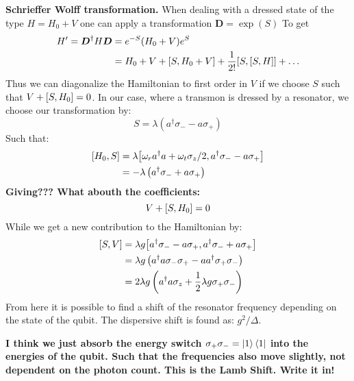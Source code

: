 \vspace{0.5 cm}
\textbf{Schrieffer Wolff transformation.} When dealing with a dressed state of the type $H = H_0 + V$ one can apply a transformation $\boldsymbol{D} = \exp(S)$ To get
\begin{align*}
    H' = \boldsymbol{D}^\dagger H \boldsymbol{D} &= e^{-S} (H_0 + V) e^{S} \\
    &= H_0 + V + \comm{S}{H_0 + V} + \frac{1}{2!} \comm{S}{\comm{S}{H}} + \dots
\end{align*}
Thus we can diagonalize the Hamiltonian to first order in $V$ if we choose $S$ such that $V + \comm{S}{H_0} = 0$. In our case, where a transmon is dressed by a resonator, we choose our transformation by:
\begin{equation}
    S = \lambda (a^\dagger \sigma_- - a \sigma_+)
\end{equation}
Such that:
\begin{align*}
    \comm{H_0}{S} &= \lambda\comm{\omega_r a^\dagger a + \omega_t \sigma_z / 2}{a^\dagger \sigma_- - a \sigma_+} \\
    &= - \lambda \left(a^\dagger \sigma_- + a \sigma_+\right)
\end{align*}
\textbf{Giving??? What abouth the coefficients:}
\begin{equation*}
    V + \comm{S}{H_0} = 0
\end{equation*}
While we get a new contribution to the Hamiltonian by:
\begin{align*}
    \comm{S}{V} &= \lambda g \comm{a^\dagger \sigma_- - a \sigma_+}{a^\dagger \sigma_- + a \sigma_+} \\
                &= \lambda g \left(a^\dagger a \sigma_- \sigma_+ - a a^\dagger \sigma_+ \sigma_-\right) \\
                &= 2 \lambda g \left(a^\dagger a \sigma_z + \frac12 \lambda g \sigma_+\sigma_-\right)
\end{align*}
From here it is possible to find a shift of the resonator frequency depending on the state of the qubit. The dispersive shift is found as: $g^2 / \Delta$. 

\textbf{I think we just absorb the energy switch $\sigma_+\sigma_- = \ket{1}\bra{1}$ into the energies of the qubit. Such that the frequencies also move slightly, not dependent on the photon count. This is the Lamb Shift. Write it in!} 

